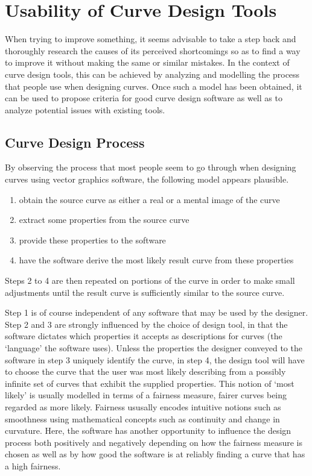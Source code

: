 \documentclass[a4paper]{article}
\begin{document}

	\section{Usability of Curve Design Tools}

		When trying to improve something, it seems advisable to take a step back and thoroughly research the causes of its perceived shortcomings so as to find a way to improve it without making the same or similar mistakes. In the context of curve design tools, this can be achieved by analyzing and modelling the process that people use when designing curves. Once such a model has been obtained, it can be used to propose criteria for good curve design software as well as to analyze potential issues with existing tools.

		\subsection{Curve Design Process}
		\label{section:curve_design_process}

			By observing the process that most people seem to go through when designing curves using vector graphics software, the following model appears plausible.

			\begin{enumerate}
				\item obtain the source curve as either a real or a mental image of the curve
				\item extract some properties from the source curve
				\item provide these properties to the software
				\item have the software derive the most likely result curve from these properties
			\end{enumerate}

			Steps 2 to 4 are then repeated on portions of the curve in order to make small adjustments until the result curve is sufficiently similar to the source curve.

			Step 1 is of course independent of any software that may be used by the designer. Step 2 and 3 are strongly influenced by the choice of design tool, in that the software dictates which properties it accepts as descriptions for curves (the `language' the software uses). Unless the properties the designer conveyed to the software in step 3 uniquely identify the curve, in step 4, the design tool will have to choose the curve that the user was most likely describing from a possibly infinite set of curves that exhibit the supplied properties. This notion of `most likely' is usually modelled in terms of a fairness measure, fairer curves being regarded as more likely. Fairness ususally encodes intuitive notions such as smoothness using mathematical concepts such as continuity and change in curvature. Here, the software has another opportunity to influence the design process both positively and negatively depending on how the fairness measure is chosen as well as by how good the software is at reliably finding a curve that has a high fairness.
\end{document}
